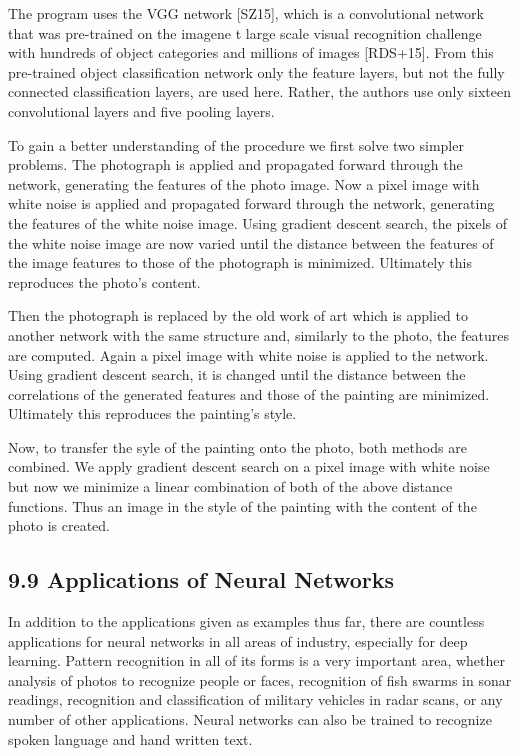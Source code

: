 \documentclass[10pt]{article}
\begin{document}
The program uses the VGG network [SZ15], which is a convolutional network that was pre-trained on the imagene
t large scale visual recognition challenge with hundreds of object categories and millions of images [RDS+15]. From this pre-trained object classification network only the feature layers, but not the fully connected classification layers, are used here. Rather, the authors use only sixteen convolutional layers and five pooling layers.

To gain a better understanding of the procedure we first solve two simpler problems. The photograph is applied and propagated forward through the network, generating the features of the photo image. Now a pixel image with white noise is applied and propagated forward through the network, generating the features of the white noise image. Using gradient descent search, the pixels of the white noise image are now varied until the distance between the features of the image features to those of the photograph is minimized. Ultimately this reproduces the photo's content.

Then the photograph is replaced by the old work of art which is applied to another network with the same structure and, similarly to the photo, the features are computed. Again a pixel image with white noise is applied to the network. Using gradient descent search, it is changed until the distance between the correlations of the generated features and those of the painting are minimized. Ultimately this reproduces the painting's style.

Now, to transfer the syle of the painting onto the photo, both methods are combined. We apply gradient descent search on a pixel image with white noise but now we minimize a linear combination of both of the above distance functions. Thus an image in the style of the painting with the content of the photo is created.

\subsection*{9.9 Applications of Neural Networks}
In addition to the applications given as examples thus far, there are countless applications for neural networks in all areas of industry, especially for deep learning. Pattern recognition in all of its forms is a very important area, whether analysis of photos to recognize people or faces, recognition of fish swarms in sonar readings, recognition and classification of military vehicles in radar scans, or any number of other applications. Neural networks can also be trained to recognize spoken language and hand written text.
\end{document}
